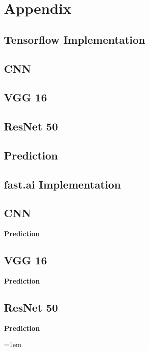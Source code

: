 \documentclass[10pt]{report}
\begin{document}
	\chapter{Appendix}

	\section{Tensorflow Implementation}%

	\section{CNN}
	

	\section{VGG 16}
	

	\section{ResNet 50}
	

	\section{Prediction}
	

	\section{fast.ai Implementation}%

	\section{CNN}
	

	\textbf{Prediction}
	

	\section{VGG 16}
	

	\textbf{Prediction}
	

	\section{ResNet 50}
	

	\textbf{Prediction}
	

	\emergencystretch=1em
	\printbibliography[heading=bibintoc,title={References}]
\end{document}
